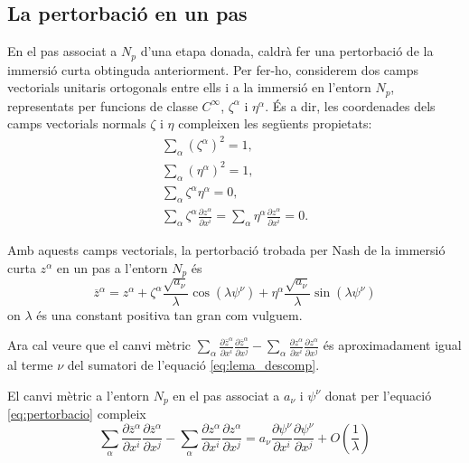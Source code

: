 \subsection{La pertorbació en un pas}
En el pas associat a $N_p$ d'una etapa donada, caldrà fer una pertorbació de la immersió curta obtinguda anteriorment. Per fer-ho, considerem dos camps vectorials unitaris ortogonals entre ells i a la immersió en l'entorn $N_p$, representats per funcions de classe $C^\infty$, $\zeta^\alpha$ i $\eta^\alpha$. 
És a dir, les coordenades dels camps vectorials normals $\zeta$ i $\eta$ compleixen les següents propietats:
\begin{align*}
    \sum_\alpha (\zeta^\alpha)^2 = 1, \\
    \sum_\alpha (\eta^\alpha)^2 = 1, \\
    \sum_\alpha \zeta^\alpha\eta^\alpha = 0, \\
    \sum_\alpha \zeta^\alpha\frac{\partial z^\alpha}{\partial x^i} = \sum_\alpha \eta^\alpha\frac{\partial z^\alpha}{\partial x^i} = 0.
\end{align*}

Amb aquests camps vectorials, la pertorbació trobada per Nash de la immersió curta $z^\alpha$ en un pas a l'entorn $N_p$ és
\begin{equation}\label{eq:pertorbacio}
    \boxed{\overline{z}^\alpha = z^\alpha + \zeta^\alpha\frac{\sqrt{a_\nu}}{\lambda}\cos(\lambda \psi^\nu) + \eta^\alpha\frac{\sqrt{a_\nu}}{\lambda}\sin(\lambda \psi^\nu)}
\end{equation}
on $\lambda$ és una constant positiva tan gran com vulguem.

Ara cal veure que el canvi mètric $\sum_\alpha\frac{\partial\overline{z}^\alpha}{\partial x^i}\frac{\partial\overline{z}^\alpha}{\partial x^j}-\sum_\alpha\frac{\partial z^\alpha}{\partial x^i}\frac{\partial z^\alpha}{\partial x^j}$ és aproximadament igual al terme $\nu$ del sumatori de l'equació \eqref{eq:lema_descomp}.

\begin{prop}\label{prop:mida_pertorbacio}
    El canvi mètric a l'entorn $N_p$ en el pas associat a $a_\nu$ i $\psi^\nu$ donat per l'equació \eqref{eq:pertorbacio} compleix
    \begin{equation}\label{eq:pertorbacio_cota}
        \sum_\alpha\frac{\partial\overline{z}^\alpha}{\partial x^i}\frac{\partial\overline{z}^\alpha}{\partial x^j}-\sum_\alpha\frac{\partial z^\alpha}{\partial x^i}\frac{\partial z^\alpha}{\partial x^j} =  a_\nu \frac{\partial\psi^\nu}{\partial x^i}\frac{\partial\psi^\nu}{\partial x^j} + O\left(\frac1\lambda\right)
    \end{equation}
\end{prop}

